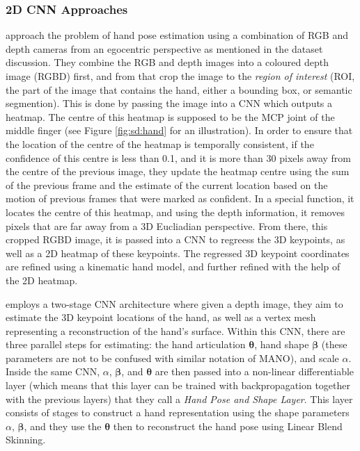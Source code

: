 \subsubsection{2D CNN Approaches}
\cite{mueller2017real} approach the problem of hand pose estimation using a combination of RGB and depth cameras from an egocentric perspective as mentioned in the dataset discussion. They combine the RGB and depth images into a coloured depth image (RGBD) first, and from that crop the image to the {\slshape region of interest} (ROI, the part of the image that contains the hand, either a bounding box, or semantic segmention). This is done by passing the image into a CNN which outputs a heatmap. The centre of this heatmap is supposed to be the MCP joint of the middle finger (see Figure \ref{fig:sd:hand} for an illustration). In order to ensure that the location of the centre of the heatmap is temporally consistent, if the confidence of this centre is less than 0.1, and it is more than 30 pixels away from the centre of the previous image, they update the heatmap centre using the sum of the previous frame and the estimate of the current location based on the motion of previous frames that were marked as confident. In a special function, it locates the centre of this heatmap, and using the depth information, it removes pixels that are far away from a 3D Eucliadian perspective. From there, this cropped RGBD image, it is passed into a CNN to regreess the 3D keypoints, as well as a 2D heatmap of these keypoints. The regressed 3D keypoint coordinates are refined using a kinematic hand model, and further refined with the help of the 2D heatmap.

\cite{malik2018deephps} employs a two-stage CNN architecture where given a depth image, they aim to estimate the 3D keypoint locations of the hand, as well as a vertex mesh representing a reconstruction of the hand's surface. Within this CNN, there are three parallel steps for estimating: the hand articulation $\bm{\theta}$, hand shape $\bm{\beta}$ (these parameters are not to be confused with similar notation of MANO), and scale $\alpha$. Inside the same CNN, $\alpha$, $\bm{\beta}$, and $\bm{\theta}$ are then passed into a non-linear differentiable layer (which means that this layer can be trained with backpropagation together with the previous layers) that they call a {\slshape Hand Pose and Shape Layer}. This layer consists of stages to construct a hand representation using the shape parameters $\alpha$, $\bm{\beta}$, and they use the $\bm{\theta}$ then to reconstruct the hand pose using Linear Blend Skinning.

